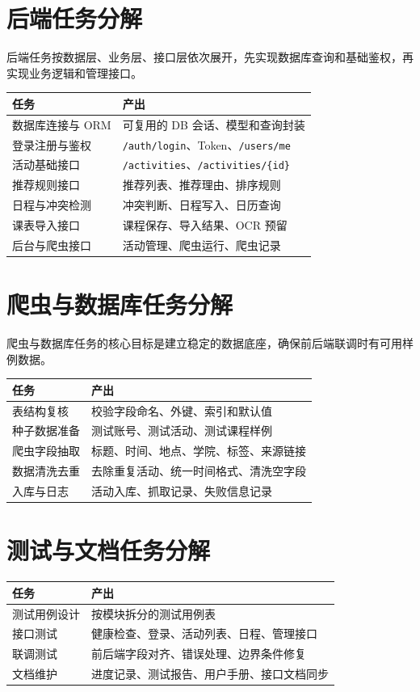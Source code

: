 \documentclass[UTF8,a4paper,12pt,fontset=none]{ctexrep}
\begin{document}
\section{后端任务分解}
后端任务按数据层、业务层、接口层依次展开，先实现数据库查询和基础鉴权，再实现业务逻辑和管理接口。

\begin{longtable}{|p{}|p{}|}
\hline
\textbf{任务} & \textbf{产出} \\
\hline
数据库连接与 ORM & 可复用的 DB 会话、模型和查询封装 \\
\hline
登录注册与鉴权 & \texttt{/auth/login}、Token、\texttt{/users/me} \\
\hline
活动基础接口 & \texttt{/activities}、\texttt{/activities/\{id\}} \\
\hline
推荐规则接口 & 推荐列表、推荐理由、排序规则 \\
\hline
日程与冲突检测 & 冲突判断、日程写入、日历查询 \\
\hline
课表导入接口 & 课程保存、导入结果、OCR 预留 \\
\hline
后台与爬虫接口 & 活动管理、爬虫运行、爬虫记录 \\
\hline
\end{longtable}

\section{爬虫与数据库任务分解}
爬虫与数据库任务的核心目标是建立稳定的数据底座，确保前后端联调时有可用样例数据。

\begin{longtable}{|p{}|p{}|}
\hline
\textbf{任务} & \textbf{产出} \\
\hline
表结构复核 & 校验字段命名、外键、索引和默认值 \\
\hline
种子数据准备 & 测试账号、测试活动、测试课程样例 \\
\hline
爬虫字段抽取 & 标题、时间、地点、学院、标签、来源链接 \\
\hline
数据清洗去重 & 去除重复活动、统一时间格式、清洗空字段 \\
\hline
入库与日志 & 活动入库、抓取记录、失败信息记录 \\
\hline
\end{longtable}

\section{测试与文档任务分解}
\begin{longtable}{|p{}|p{}|}
\hline
\textbf{任务} & \textbf{产出} \\
\hline
测试用例设计 & 按模块拆分的测试用例表 \\
\hline
接口测试 & 健康检查、登录、活动列表、日程、管理接口 \\
\hline
联调测试 & 前后端字段对齐、错误处理、边界条件修复 \\
\hline
文档维护 & 进度记录、测试报告、用户手册、接口文档同步 \\
\hline
\end{longtable}
\end{document}
